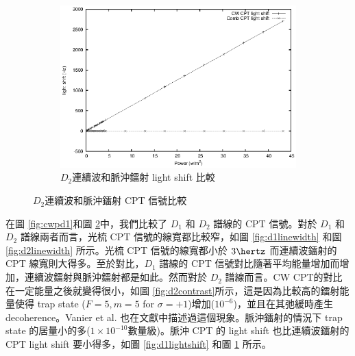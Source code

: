 \documentclass[11pt,a4paper]{article}
\begin{document}
\begin{figure}
\begin{subfigure}[b]{0.6\textwidth}
\includegraphics[width=\textwidth]{d2_cw_p/lightshift.eps}
\caption{$D_2$連續波和脈沖鐳射 light shift 比較}
\label{fig:d2lightshift}
\end{subfigure}
\caption{$D_2$連續波和脈沖鐳射 CPT 信號比較}
\label{fig:cwpd2}
\end{figure}

在圖 \ref{fig:cwpd1}和圖 \ref{fig:cwpd2}中，我們比較了 $D_1$ 和 $D_2$ 譜線的 CPT 信號。對於 $D_1$ 和 $D_2$ 譜線兩者而言，光梳 CPT 信號的線寬都比較窄，如圖 \ref{fig:d1linewidth} 和圖 \ref{fig:d2linewidth} 所示。光梳 CPT 信號的線寬都小於 $3 \hertz$ 而連續波鐳射的 CPT 線寬則大得多。至於對比，$D_1$ 譜線的 CPT 信號對比隨著平均能量增加而增加，連續波鐳射與脈沖鐳射都是如此。然而對於 $D_2$ 譜線而言。CW CPT的對比在一定能量之後就變得很小，如圖 \ref{fig:d2contrast}所示，這是因為比較高的鐳射能量使得 trap state ($F=5, m=5$ for $\sigma = +1$)增加($10^{-6}$)，並且在其弛緩時產生 decoherence。Vanier et al. 也在文獻中描述過這個現象\cite{Vanier1998}。脈沖鐳射的情況下 trap state 的居量小的多($1 \times 10^{-10}$數量級)。脈沖 CPT 的 light shift 也比連續波鐳射的 CPT light shift 要小得多，如圖 \ref{fig:d1lightshift} 和圖 \ref{fig:d2lightshift} 所示。

\end{document}
